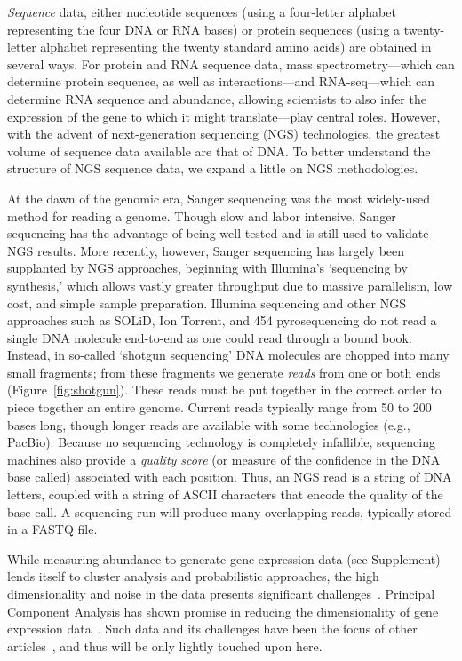 \documentclass{acm_proc_article-sp}
\begin{document}
\emph{Sequence} data, either 
nucleotide sequences (using a four-letter alphabet representing the four
DNA or RNA bases) or protein sequences (using a twenty-letter alphabet 
representing the twenty standard amino acids)
are obtained in several ways.
For protein and RNA sequence data, mass spectrometry---which
can determine protein sequence, as well as interactions---and RNA-seq---which can determine RNA sequence and abundance, 
allowing scientists to also infer the expression of the gene to which it might translate---play central roles.
However, with the advent of next-generation sequencing (NGS) technologies, the greatest volume of sequence data available are that of DNA.
To better understand the structure of NGS sequence data, we expand a little on NGS methodologies.

At the dawn of the genomic era, Sanger sequencing was the most widely-used 
method for reading a genome.
Though slow and labor intensive, Sanger sequencing has the advantage of being
well-tested and is still used to validate NGS results.
More recently, however, Sanger sequencing has largely been supplanted by NGS approaches,
beginning with Illumina's `sequencing by synthesis,' which allows vastly 
greater throughput due to massive parallelism, low cost, and simple sample
preparation.
Illumina sequencing and other NGS approaches
such as SOLiD, Ion Torrent, and 454 pyrosequencing do not read a single DNA
molecule end-to-end as one could read through a bound book.
Instead, in so-called `shotgun sequencing' DNA molecules are chopped into many small fragments;
from these fragments we generate 
\emph{reads} from one or both ends (Figure~\ref{fig:shotgun}).
These reads must be put together in the correct order 
to piece together an entire genome.
Current reads typically range from 50 to 200 bases long, though longer reads are
available with some technologies (e.g., PacBio).
Because no sequencing technology is completely infallible, sequencing machines also
provide a \emph{quality score} (or measure of the confidence in the DNA base
called) associated with each position.
Thus, an NGS read is a string of DNA letters, coupled with a string of ASCII
characters that encode the quality of the base call.
A sequencing run will produce many overlapping reads, typically stored in a FASTQ
file.

While measuring abundance to generate gene expression data (see Supplement) lends itself to cluster analysis 
and probabilistic 
approaches, the high dimensionality and noise in the data presents significant 
challenges~\cite{berger2013computational}.
Principal Component Analysis has shown promise in reducing the dimensionality
of gene expression 
data~\cite{berger2013computational}.
Such data and its challenges have been the focus of other 
articles~\cite{berger2013computational}, and thus will be only lightly touched 
upon here.
\end{document}
